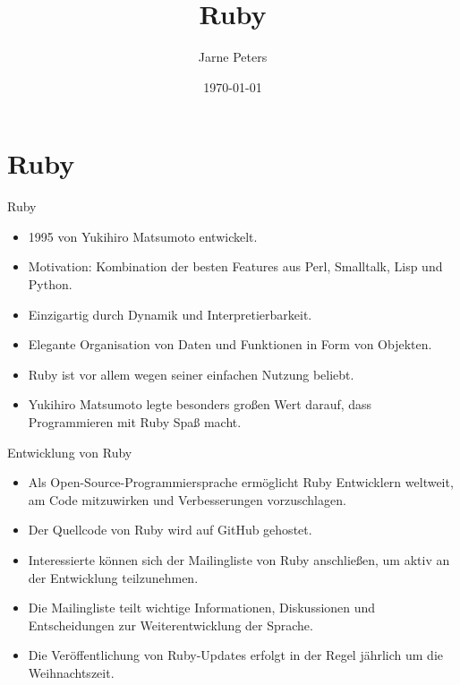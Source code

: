 \documentclass{beamer}
\title{Ruby}
\author{Jarne Peters}
\date{\today}
\begin{document}
\begin{frame}
\titlepage
\end{frame}

\section{Ruby}



\begin{frame}{Ruby}
  \begin{itemize}

    \item 1995 von Yukihiro Matsumoto entwickelt.
    \item Motivation: Kombination der besten Features aus Perl, Smalltalk, Lisp und Python.
    \item Einzigartig durch Dynamik und Interpretierbarkeit.
    \item Elegante Organisation von Daten und Funktionen in Form von Objekten.
    \item Ruby ist vor allem wegen seiner einfachen Nutzung beliebt.
    \item Yukihiro Matsumoto legte besonders großen Wert darauf, dass Programmieren mit Ruby Spaß macht.
  \end{itemize}
\end{frame}


\begin{frame}{Entwicklung von Ruby}
  \begin{itemize}
    \item Als Open-Source-Programmiersprache ermöglicht Ruby Entwicklern weltweit, am Code mitzuwirken und Verbesserungen vorzuschlagen.
    \item Der Quellcode von Ruby wird auf GitHub gehostet.
    \item Interessierte können sich der Mailingliste von Ruby anschließen, um aktiv an der Entwicklung teilzunehmen.
    \item Die Mailingliste teilt wichtige Informationen, Diskussionen und Entscheidungen zur Weiterentwicklung der Sprache.
    \item Die Veröffentlichung von Ruby-Updates erfolgt in der Regel jährlich um die Weihnachtszeit.
  \end{itemize}
\end{frame}
\end{document}
